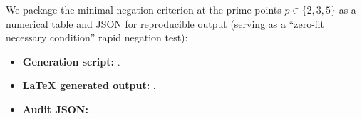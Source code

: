 \par
We package the minimal negation criterion at the prime points \(p\in\{2,3,5\}\) as a numerical table and JSON for reproducible output (serving as a ``zero-fit necessary condition'' rapid negation test):
\begin{itemize}
  \item \textbf{Generation script:} \texttt{}.
  \item \textbf{LaTeX generated output:} \texttt{}.
  \item \textbf{Audit JSON:} \texttt{}.
\end{itemize}
